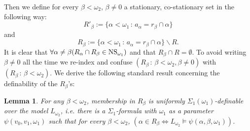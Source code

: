 \documentclass[a4paper,12pt]{article}
\newtheorem{lemma}[theorem]{Lemma}
\begin{document}
Then we define for every $\beta < \omega_2$, $\beta \ne 0$
a stationary, co-stationary set in the following way:
\[R'_{\beta} := \{ \alpha < \omega_1 \, : \, a_{\alpha}= {r}_{\beta} \cap \alpha \}\]
and 
\[R_{\beta} := \{ \alpha < \omega_1 \, : \, a_{\alpha}= {r}_{\beta} \cap \alpha \} \backslash R.\]
 It is clear that $\forall \alpha \ne \beta (R_{\alpha} \cap R_{\beta} \in \hbox{NS}_{\omega_1})$ and that $R_{\beta} \cap R=\emptyset$. 
To avoid writing $\beta \ne 0$ all the time we re-index and confuse $(R_{\beta} \, : \, \beta < \omega_2, \beta \ne 0)$ with $(R_{\beta} \, : \, \beta < \omega_2)$.
We derive the following standard result concerning the definability of the $R_{\beta}$'s:
\begin{lemma}\label{computationofRbetas}
For any $\beta < \omega_2$, membership in $R_{\beta}$ is uniformly $\Sigma_1(\omega_1)$-definable over the model $L_{\omega_2}$, i.e. there is a $\Sigma_1$-formula with $\omega_1$ as a parameter $\psi(v_0,v_1, \omega_1)$ such that for every $\beta < \omega_2$,
$(\alpha \in R_{\beta} \Leftrightarrow L_{\omega_2} \models \psi(\alpha, \beta,\omega_1))$. 
\end{lemma}
\end{document}
